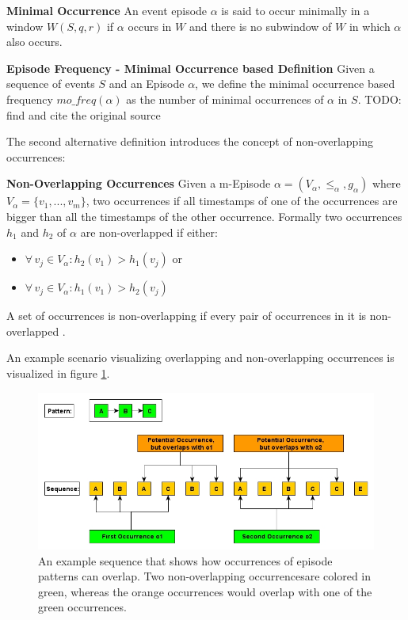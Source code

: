 \begin{mydef}
\textbf{Minimal Occurrence} An event episode $\alpha$ is said to occur minimally in a window $W(S,q,r)$ if $\alpha$ occurs in $W$ and there is no subwindow of $W$ in which $\alpha$ also occurs. %
\end{mydef}

\begin{mydef}
\textbf{Episode Frequency - Minimal Occurrence based Definition} Given a sequence of events $S$ and an Episode $\alpha$, we define the minimal occurrence based frequency $mo\_freq(\alpha )$ as the number of minimal occurrences of $\alpha$ in $S$. TODO: find and cite the original source
\end{mydef}

The second alternative definition introduces the concept of non-overlapping occurrences:

\begin{mydef}
\textbf{Non-Overlapping Occurrences} Given a m-Episode $\alpha = (V_\alpha,{\leq}_{\alpha},g_\alpha)$ where $V_\alpha = \{v_1,...,v_m\}$, two occurrences if all timestamps of one of the occurrences are bigger than all the timestamps of the other occurrence. Formally two occurrences $h_1$ and $h_2$ of $\alpha$ are non-overlapped if either:
\begin{itemize}
	\item $\forall \, v_j \in V_\alpha : h_2(v_1)>h_1(v_j)$ or 
	\item $\forall \, v_j \in V_\alpha : h_1(v_1)>h_2(v_j)$
\end{itemize}
A set of occurrences is non-overlapping if every pair of occurrences in it is non-overlapped \cite{laxman2007fast}.
\end{mydef}

An example scenario visualizing overlapping and non-overlapping occurrences is visualized in figure \ref{fig_nonOverlappingExample}.


\begin{figure}[h]
	\centering
  	\includegraphics[width=\textwidth]{nonOverlappingExample}
	\caption{An example sequence that shows how occurrences of episode patterns can overlap. Two non-overlapping occurrencesare colored in green, whereas the orange occurrences would overlap with one of the green occurrences.}
	\label{fig_nonOverlappingExample}
\end{figure}

